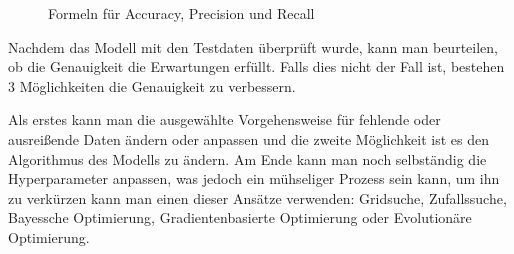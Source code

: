 \begin{enumerate}
\begin{figure}[H]
              \caption{Formeln für Accuracy, Precision und Recall}
          \end{figure}

          Nachdem das Modell mit den Testdaten überprüft wurde, kann man beurteilen, ob die Genauigkeit die Erwartungen erfüllt. Falls dies nicht der Fall ist, bestehen 3 Möglichkeiten die Genauigkeit zu verbessern.

          Als erstes kann man die ausgewählte Vorgehensweise für fehlende oder ausreißende Daten ändern oder anpassen und die zweite Möglichkeit ist es den Algorithmus des Modells zu ändern. Am Ende kann man noch selbständig die Hyperparameter anpassen, was jedoch ein mühseliger Prozess sein kann, um ihn zu verkürzen kann man einen dieser Ansätze verwenden: Gridsuche, Zufallssuche, Bayessche Optimierung, Gradientenbasierte Optimierung oder Evolutionäre Optimierung. \cite{MLkg}
\end{enumerate}